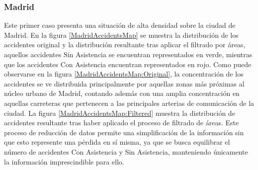 \subsubsection*{Madrid}

Este primer caso presenta una situación de alta densidad sobre la ciudad de Madrid. En la figura \ref{MadridAccidentsMap} se muestra la distribución de los accidentes original y la distribución resultante tras aplicar el filtrado por áreas, aquellos accidentes Sin Asistencia se encuentran representados en verde, mientras que los accidentes Con Asistencia encuentran representados en rojo. Como puede observarse en la figura \ref{MadridAccidentsMap:Original}, la concentración de los accidentes se ve distribuida principalmente por aquellas zonas más próximas al núcleo urbano de Madrid, contando además con una amplia concentración en aquellas carreteras que pertenecen a las principales arterias de comunicación de la ciudad. La figura  \ref{MadridAccidentsMap:Filtered} muestra la distribución de accidentes resultante tras haber aplicado el proceso de filtrado de áreas. Este proceso de reducción de datos permite una simplificación de la información sin que esto represente una pérdida en sí misma, ya que se busca equilibrar el número de accidentes Con Asistencia y Sin Asistencia, manteniendo únicamente la información imprescindible para ello.

